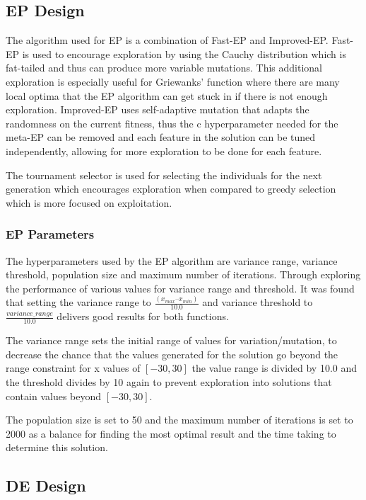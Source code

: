 \documentclass{article}
\begin{document}
\subsection*{EP Design}
The algorithm used for EP is a combination of Fast-EP and Improved-EP. Fast-EP is used to encourage exploration by using the Cauchy distribution which is fat-tailed and thus can produce more variable mutations. This additional exploration is especially useful for Griewanks’ function where there are many local optima that the EP algorithm can get stuck in if there is not enough exploration. Improved-EP uses self-adaptive mutation that adapts the randomness on the current fitness, thus the c hyperparameter needed for the meta-EP can be removed and each feature in the solution can be tuned independently, allowing for more exploration to be done for each feature. \par
\noindent The tournament selector is used for selecting the individuals for the next generation which encourages exploration when compared to greedy selection which is more focused on exploitation.  \par
\subsubsection*{EP Parameters}
The hyperparameters used by the EP algorithm are variance range, variance threshold, population size and maximum number of iterations. Through exploring the performance of various values for variance range and threshold. It was found that setting the variance range to $\frac{(x_{max} – x_{min})}{10.0}$ and variance threshold to $\frac{variance\_range}{10.0}$ delivers good results for both functions. \par
\noindent The variance range sets the initial range of values for variation/mutation, to decrease the chance that the values generated for the solution go beyond the range constraint for x values of $[-30,30]$ the value range is divided by 10.0 and the threshold divides by 10 again to prevent exploration into solutions that contain values beyond $[-30,30]$.  \par
\noindent The population size is set to 50 and the maximum number of iterations is set to 2000 as a balance for finding the most optimal result and the time taking to determine this solution. \par
\subsection*{DE Design}
\end{document}
